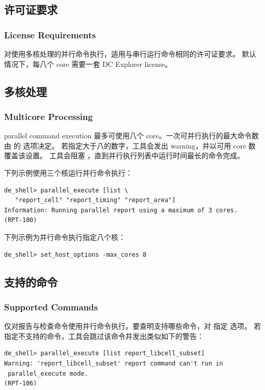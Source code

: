 \subsection{许可证要求}
\subsubsection*{License Requirements}

对使用多核处理的并行命令执行，适用与串行运行命令相同的许可证要求。
默认情况下，每八个 core 需要一套 DC Explorer license。

\subsection{多核处理}
\subsubsection*{Multicore Processing}

parallel command execution 最多可使用八个 core。一次可并行执行的最大命令数由  的  选项决定。
若指定大于八的数字，工具会发出 warning，并以可用 core 数覆盖该设置。
工具会阻塞 ，直到并行执行列表中运行时间最长的命令完成。

下列示例使用三个核运行并行命令执行：
\begin{lstlisting}
de_shell> parallel_execute [list \
   "report_cell" "report_timing" "report_area"]
Information: Running parallel report using a maximum of 3 cores.
(RPT-100)
\end{lstlisting}

下列示例为并行命令执行指定八个核：
\begin{lstlisting}
de_shell> set_host_options -max_cores 8
\end{lstlisting}

\subsection{支持的命令}
\subsubsection*{Supported Commands}

仅对报告与检查命令使用并行命令执行。要查明支持哪些命令，对  指定  选项。
若指定不支持的命令，工具会跳过该命令并发出类似如下的警告：
\begin{lstlisting}
de_shell> parallel_execute [list report_libcell_subset]
Warning: 'report_libcell_subset' report command can't run in
 parallel_execute mode.
(RPT-106)
\end{lstlisting}

